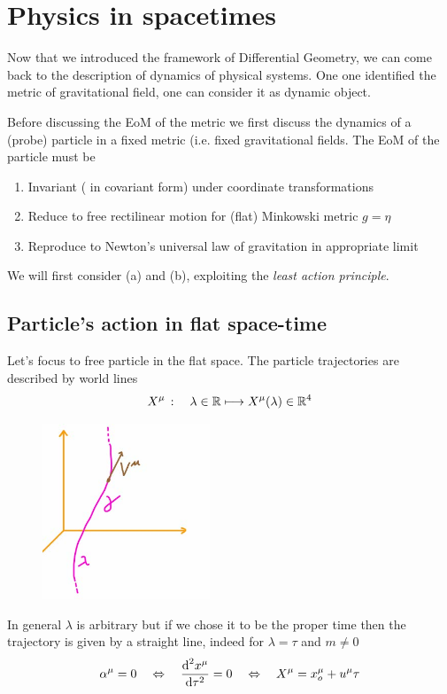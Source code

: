 \documentclass[../main/main.tex]{subfiles}
\begin{document}
\chapter {Physics in spacetimes}



Now that we introduced the framework of Differential Geometry, we can come back to the description of dynamics of physical systems. One one identified the metric of gravitational field, one can consider it as dynamic object. 

Before discussing the EoM of the metric we first discuss the dynamics of a (probe) particle in a fixed metric (i.e. fixed gravitational fields.
The EoM of the particle must be
\begin{enumerate}[label=(\alph*)]
\item Invariant ( in covariant form) under coordinate transformations
\item Reduce to free rectilinear motion for (flat) Minkowski metric $g=\eta$
\item Reproduce to Newton's universal law of gravitation in appropriate limit
\end{enumerate}
We will first consider (a) and (b), exploiting the \emph{least action principle}.

\section{Particle's action in flat space-time}

Let's focus to free particle in the flat space. The particle trajectories are described by world lines
\[X^\mu\,:\quad\lambda\in\mathbb{R}\longmapsto X^\mu(\lambda)\in\mathbb{R}^4\]
\begin{figure}[H]
\centering
\includegraphics[width=5cm]{../img/world-line-particle-traject.jpg}
\end{figure}

In general $\lambda$ is arbitrary but if we chose it to be the proper time then the trajectory is given by a straight line, indeed for $\lambda=\tau$ and $m\neq0$
\[\alpha^\mu=0\quad\Leftrightarrow\quad\frac{\textup{d}^2 x^\mu}{\textup{d} \tau^2}=0\quad\Leftrightarrow\quad X^\mu=x_o^\mu+u^\mu\tau\]
\end{document}
